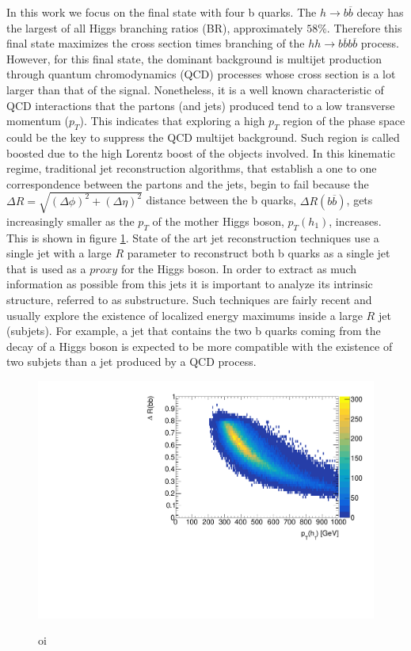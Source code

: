 In this work we focus on the final state with four b quarks. The $h\rightarrow b\overline{b}$ decay has the largest of all Higgs branching ratios (BR), approximately $58\%$. Therefore this final state maximizes the cross section times branching of the $hh\rightarrow b\overline{b}b\overline{b}$ process. However, for this final state, the dominant background is multijet production through quantum chromodynamics (QCD) processes whose cross section is a lot larger than that of the signal. Nonetheless, it is a well known characteristic of QCD interactions that the partons (and jets) produced tend to a low transverse momentum ($p_T$). This indicates that exploring a high $p_T$ region of the phase space could be the key to suppress the QCD multijet background. Such region is called boosted due to the high Lorentz boost of the objects involved. In this kinematic regime, traditional jet reconstruction algorithms, that establish a one to one correspondence between the partons and the jets, begin to fail because the $\Delta R=\sqrt{(\Delta\phi)^2+(\Delta\eta)^2}$ distance between the b quarks, $\Delta R(b\overline{b})$, gets increasingly smaller as the $p_T$ of the mother Higgs boson, $p_T(h_1)$, increases. This is shown in figure \ref{fig:deltaRbb_pt}. State of the art jet reconstruction techniques \cite{jetsub} use a single jet with a large $R$ parameter to reconstruct both b quarks as a single jet that is used as a $\textit{proxy}$ for the Higgs boson. In order to extract as much information as possible from this jets it is important to analyze its intrinsic structure, referred to as substructure. Such techniques are fairly recent and usually explore the existence of localized energy maximums inside a large $R$ jet (subjets). For example, a jet that contains the two b quarks coming from the decay of a Higgs boson is expected to be more compatible with the existence of two subjets than a jet produced by a QCD process.

\begin{figure}[h]
	\centering
	\includegraphics[trim={.5cm 0 0 0},clip,width=\linewidth]{./images/hist_deltaR_bb_pt.pdf}
	\label{fig:deltaRbb_pt}
	\caption{oi}
\end{figure}

